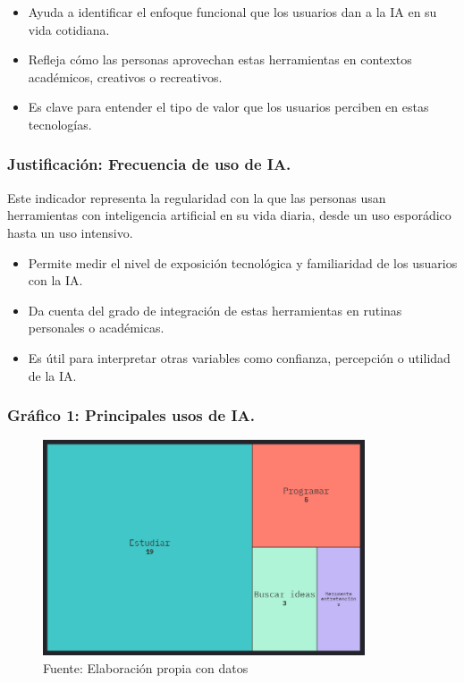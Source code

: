 \documentclass[12pt, a4paper]{article}
\begin{document}
\begin{itemize}
    \item Ayuda a identificar el enfoque funcional que los usuarios dan a la IA en su vida cotidiana.
    \item Refleja cómo las personas aprovechan estas herramientas en contextos académicos, creativos o recreativos.
    \item Es clave para entender el tipo de valor que los usuarios perciben en estas tecnologías.
\end{itemize}

\subsubsection*{Justificación: Frecuencia de uso de IA.}
Este indicador representa la regularidad con la que las personas usan herramientas con inteligencia artificial en su vida diaria, desde un uso esporádico hasta un uso intensivo.

\begin{itemize}
    \item Permite medir el nivel de exposición tecnológica y familiaridad de los usuarios con la IA.
    \item Da cuenta del grado de integración de estas herramientas en rutinas personales o académicas.
    \item Es útil para interpretar otras variables como confianza, percepción o utilidad de la IA.
\end{itemize}


\subsubsection*{Gráfico 1:  Principales usos de IA.}
\begin{figure}[H]
    \centering
    \includegraphics[width=0.85\textwidth]{Graficos/Treemap_Uso_IA_FC.png}
    \caption[1]{Fuente: Elaboración propia con datos}
\end{figure}
\end{document}
